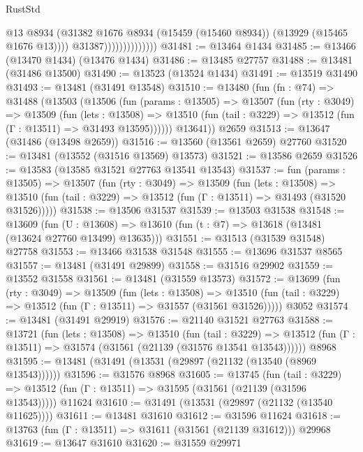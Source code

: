 \begin{lexlean}{RustStd}
\begin{coremodule}
                                  @13
                                  @8934
                                  (@31382
                                    @1676
                                    @8934
                                    (@15459 (@15460 @8934))
                                    (@13929 (@15465 @1676 @13))))
                                @31387))))))))))))))
@31481 := @13464 @1434
@31485 := @13466 (@13470 @1434) (@13476 @1434)
@31486 := @13485 @27757
@31488 := @13481 (@31486 @13500)
@31490 := @13523 (@13524 @1434)
@31491 := @13519 @31490
@31493 := @13481 (@31491 @13548)
@31510 := @13480
    (fun (fn : @74) =>
    @31488
      (@13503
        (@13506
          (fun (params : @13505) =>
          @13507
            (fun (rty : @3049) =>
            @13509
              (fun (lets : @13508) =>
              @13510 (fun (tail : @3229) => @13512 (fun (Γ : @13511) => @31493 @13595))))))
        @13641))
    @2659
@31513 := @13647 (@31486 (@13498 @2659))
@31516 := @13560 (@13561 @2659) @27760
@31520 := @13481 (@13552 (@31516 @13569) @13573)
@31521 := @13586 @2659
@31526 := @13583 (@13585 @31521 @27763 @13541 @13543)
@31537 := fun (params : @13505) =>
  @13507
    (fun (rty : @3049) =>
    @13509
      (fun (lets : @13508) =>
      @13510 (fun (tail : @3229) => @13512 (fun (Γ : @13511) => @31493 (@31520 @31526)))))
@31538 := @13506 @31537
@31539 := @13503 @31538
@31548 := @13609
    (fun (U : @13608) => @13610 (fun (t : @7) => @13618 (@13481 (@13624 @27760 @13499) @13635)))
@31551 := @31513 (@31539 @31548) @27758
@31553 := @13466 @31538 @31548
@31555 := @13696 @31537 @8565
@31557 := @13481 (@31491 @29899)
@31558 := @31516 @29902
@31559 := @13552 @31558
@31561 := @13481 (@31559 @13573)
@31572 := @13699
    (fun (rty : @3049) =>
    @13509
      (fun (lets : @13508) =>
      @13510 (fun (tail : @3229) => @13512 (fun (Γ : @13511) => @31557 (@31561 @31526)))))
    @3052
@31574 := @13481 (@31491 @29919)
@31576 := @21140 @31521 @27763
@31588 := @13721
    (fun (lets : @13508) =>
    @13510
      (fun (tail : @3229) =>
      @13512 (fun (Γ : @13511) => @31574 (@31561 (@21139 (@31576 @13541 @13543))))))
    @8968
@31595 := @13481 (@31491 (@13531 (@29897 (@21132 (@13540 (@8969 @13543))))))
@31596 := @31576 @8968
@31605 := @13745
    (fun (tail : @3229) => @13512 (fun (Γ : @13511) => @31595 (@31561 (@21139 (@31596 @13543)))))
    @11624
@31610 := @31491 (@13531 (@29897 (@21132 (@13540 @11625))))
@31611 := @13481 @31610
@31612 := @31596 @11624
@31618 := @13763 (fun (Γ : @13511) => @31611 (@31561 (@21139 @31612))) @29968
@31619 := @13647 @31610
@31620 := @31559 @29971

\end{coremodule}
\end{lexlean}
